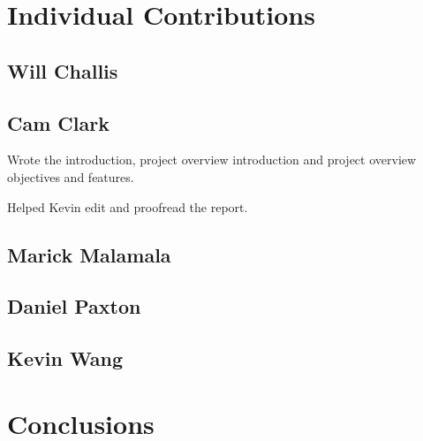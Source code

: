 \documentclass[conference]{IEEEtran}
\begin{document}
\section{Individual Contributions}
\subsection{Will Challis}

\subsection{Cam Clark}
Wrote the introduction, project overview introduction and project overview objectives and features.

Helped Kevin edit and proofread the report. 
\subsection{Marick Malamala}

\subsection{Daniel Paxton}

\subsection{Kevin Wang}


\section{Conclusions}
\end{document}
